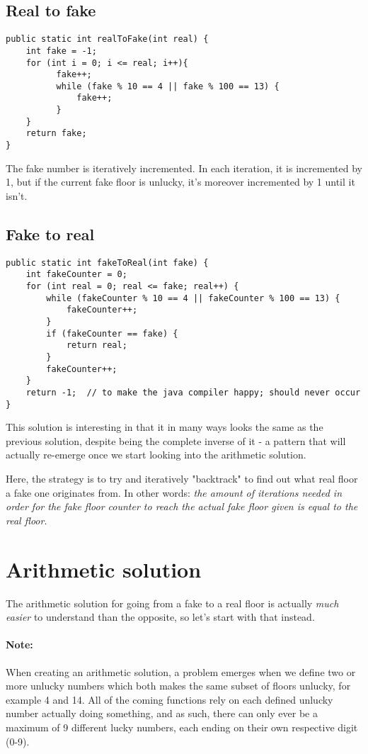\documentclass{article}
\begin{document}
\subsection{Real to fake}
\begin{lstlisting}
public static int realToFake(int real) {
    int fake = -1;
    for (int i = 0; i <= real; i++){
          fake++;
          while (fake % 10 == 4 || fake % 100 == 13) {
              fake++;
          }
    }
    return fake;    
}
\end{lstlisting}
The fake number is iteratively incremented. In each iteration, it is incremented by 1, but if the current fake floor is unlucky, it's moreover incremented by 1 until it isn't.

\subsection{Fake to real}
\begin{lstlisting}
public static int fakeToReal(int fake) {
    int fakeCounter = 0;
    for (int real = 0; real <= fake; real++) {
        while (fakeCounter % 10 == 4 || fakeCounter % 100 == 13) {
            fakeCounter++;
        }
        if (fakeCounter == fake) {
            return real;
        }
        fakeCounter++;
    }  
    return -1;  // to make the java compiler happy; should never occur
}
\end{lstlisting}
This solution is interesting in that it in many ways looks the same as the previous solution, despite being the complete inverse of it - a pattern that will actually re-emerge once we start looking into the arithmetic solution. 

Here, the strategy is to try and iteratively "backtrack" to find out what real floor a fake one originates from. In other words: \textit{the amount of iterations needed in order for the fake floor counter to reach the actual fake floor given is equal to the real floor}.

\section{Arithmetic solution}
The arithmetic solution for going from a fake to a real floor is actually \textit{much easier} to understand than the opposite, so let's start with that instead.

\paragraph{Note:} When creating an arithmetic solution, a problem emerges when we define two or more unlucky numbers which both makes the same subset of floors unlucky, for example 4 and 14. All of the coming functions rely on each defined unlucky number actually doing something, and as such, there can only ever be a maximum of 9 different lucky numbers, each ending on their own respective digit (0-9). 
\end{document}

